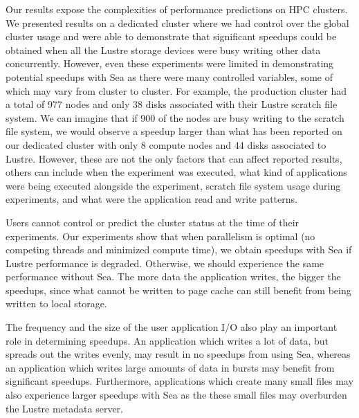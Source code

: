 \documentclass[pdflatex,sn-mathphys-num]{sn-jnl}
\theoremstyle{thmstyleone}%
\theoremstyle{thmstyletwo}%
\theoremstyle{thmstylethree}%
\begin{document}
    Our results expose the complexities of performance predictions on HPC clusters. We presented results on a dedicated cluster
    where we had
    control over the global cluster usage and were able to demonstrate that
    significant speedups could be obtained when all the Lustre storage devices were
    busy writing other data concurrently. However, even these experiments were
    limited in demonstrating potential speedups with Sea as there were many
    controlled variables, some of which may vary from cluster to cluster. For
    example, the production cluster had a total of 977 nodes and only 38 disks associated with
    their Lustre scratch file system. We can imagine that if 900 of the nodes
    are busy writing to the scratch file system, we would observe a speedup
    larger than what has been reported on our dedicated cluster with only 8 compute
    nodes and 44 disks associated to Lustre. However, these are not the only
    factors that can affect reported results, others can include when the
    experiment was executed, what kind of applications were being executed
    alongside the experiment, scratch file system usage during experiments, and
    what were the application read and write patterns.

    Users cannot control or predict the cluster status at the time of their
    experiments.
    Our experiments show that when parallelism is optimal (no competing threads
    and minimized compute time), we obtain speedups with Sea if Lustre
    performance is degraded. Otherwise, we should experience the same
    performance without Sea. The more data the application writes, the bigger
    the speedups, since what cannot be written to page cache can still benefit from
    being written to local storage.
    
    The frequency and the size of the user application I/O also play an
    important role in determining speedups. An application which writes a lot of
    data, but spreads out the writes evenly, may result in no speedups from
    using Sea, whereas an application which writes large amounts of data in
    bursts may benefit from significant speedups. Furthermore, applications
    which create many small files may also experience larger speedups with Sea
    as the these small files may overburden the Lustre metadata server.

    
\end{document}
